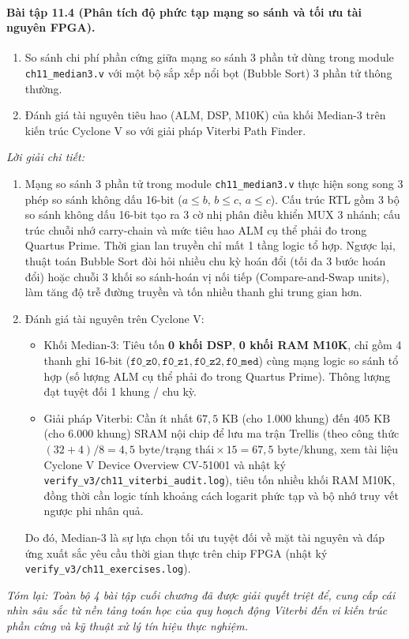 \paragraph{Bài tập 11.4 (Phân tích độ phức tạp mạng so sánh và tối ưu tài nguyên FPGA).}
\begin{enumerate}[label=(\alph*)]
    \item So sánh chi phí phần cứng giữa mạng so sánh 3 phần tử dùng trong module \texttt{ch11\_median3.v} với một bộ sắp xếp nổi bọt (Bubble Sort) 3 phần tử thông thường.
    \item Đánh giá tài nguyên tiêu hao (ALM, DSP, M10K) của khối Median-3 trên kiến trúc Cyclone V so với giải pháp Viterbi Path Finder.
\end{enumerate}

\textit{Lời giải chi tiết:}
\begin{enumerate}[label=(\alph*)]
    \item Mạng so sánh 3 phần tử trong module \texttt{ch11\_median3.v} thực hiện song song 3 phép so sánh không dấu 16-bit ($a \le b$, $b \le c$, $a \le c$). Cấu trúc RTL gồm 3 bộ so sánh không dấu 16-bit tạo ra 3 cờ nhị phân điều khiển MUX 3 nhánh; cấu trúc chuỗi nhớ carry-chain và mức tiêu hao ALM cụ thể phải đo trong Quartus Prime. Thời gian lan truyền chỉ mất 1 tầng logic tổ hợp. Ngược lại, thuật toán Bubble Sort đòi hỏi nhiều chu kỳ hoán đổi (tối đa 3 bước hoán đổi) hoặc chuỗi 3 khối so sánh-hoán vị nối tiếp (Compare-and-Swap units), làm tăng độ trễ đường truyền và tốn nhiều thanh ghi trung gian hơn.
    \item Đánh giá tài nguyên trên Cyclone V:
    \begin{itemize}
        \item Khối Median-3: Tiêu tốn \textbf{0 khối DSP}, \textbf{0 khối RAM M10K}, chỉ gồm 4 thanh ghi 16-bit ($\texttt{f0\_z0}, \texttt{f0\_z1}, \texttt{f0\_z2}, \texttt{f0\_med}$) cùng mạng logic so sánh tổ hợp (số lượng ALM cụ thể phải đo trong Quartus Prime). Thông lượng đạt tuyệt đối 1 khung / chu kỳ.
        \item Giải pháp Viterbi: Cần ít nhất $67{,}5\text{ KB}$ (cho 1.000 khung) đến $405\text{ KB}$ (cho 6.000 khung) SRAM nội chip để lưu ma trận Trellis (theo công thức $(32+4)/8 = 4{,}5\text{ byte/trạng thái} \times 15 = 67{,}5\text{ byte/khung}$, xem tài liệu Cyclone V Device Overview CV-51001 và nhật ký \texttt{verify\_v3/ch11\_viterbi\_audit.log}), tiêu tốn nhiều khối RAM M10K, đồng thời cần logic tính khoảng cách logarit phức tạp và bộ nhớ truy vết ngược phi nhân quả.
    \end{itemize}
    Do đó, Median-3 là sự lựa chọn tối ưu tuyệt đối về mặt tài nguyên và đáp ứng xuất sắc yêu cầu thời gian thực trên chip FPGA (nhật ký \texttt{verify\_v3/ch11\_exercises.log}).
\end{enumerate}

\textit{Tóm lại: Toàn bộ 4 bài tập cuối chương đã được giải quyết triệt để, cung cấp cái nhìn sâu sắc từ nền tảng toán học của quy hoạch động Viterbi đến vi kiến trúc phần cứng và kỹ thuật xử lý tín hiệu thực nghiệm.}
